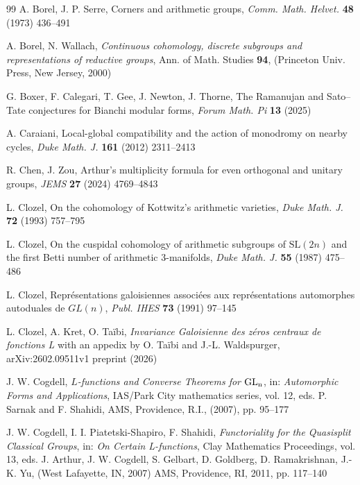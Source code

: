 \begin{thebibliography}{99}
 A. Borel, J. P. Serre, Corners and arithmetic groups, {\it Comm. Math. Helvet.} \textbf{48} (1973) 436--491

 A. Borel, N. Wallach, {\it Continuous cohomology, discrete subgroups and representations of reductive groups}, Ann. of Math. Studies {\bf 94}, (Princeton Univ. Press, New Jersey, 2000)

 G. Boxer, F. Calegari, T. Gee, J. Newton, J. Thorne, The Ramanujan and Sato--Tate conjectures for Bianchi modular forms, {\it Forum Math. Pi} \textbf{13} (2025)

 A. Caraiani, Local-global compatibility and the action of monodromy on nearby cycles, {\it Duke Math. J.} {\bf 161} (2012) 2311--2413

 R. Chen, J. Zou, Arthur's multiplicity formula for even orthogonal and unitary groups, {\it JEMS} {\bf 27} (2024) 4769--4843

 L. Clozel, On the cohomology of Kottwitz's arithmetic varieties, {\it Duke Math. J.} {\bf 72} (1993) 757--795

 L. Clozel, On the cuspidal cohomology of arithmetic subgroups of \(\text{SL}(2n)\) and the first Betti number of arithmetic $3$-manifolds, {\it Duke Math. J.} {\bf 55} (1987) 475--486 

 L. Clozel, Repr\'esentations galoisiennes associ\'ees aux repr\'esentations automorphes autoduales de $GL(n)$, {\it Publ. IHES} {\bf 73} (1991) 97--145

 L. Clozel, A. Kret, O. Ta\"ibi, {\it Invariance Galoisienne des z\'eros centraux de fonctions L} with an appedix by O. Ta\"ibi and J.-L. Waldspurger,  arXiv:2602.09511v1 preprint (2026)

 J. W. Cogdell, {\it $L$-functions and Converse Theorems for ${\rm GL_n}$}, in: {\it Automorphic Forms and Applications}, IAS/Park City mathematics series, vol. 12, eds. P. Sarnak and F. Shahidi, AMS, Providence, R.I., (2007), pp. 95--177

 J. W. Cogdell, I. I. Piatetski-Shapiro, F. Shahidi, {\it Functoriality for the Quasisplit Classical Groups}, in: {\it On Certain L-functions}, Clay Mathematics Proceedings, vol. 13, eds. J. Arthur, J. W. Cogdell, S. Gelbart, D. Goldberg, D. Ramakrishnan, J.-K. Yu, (West Lafayette, IN, 2007) AMS, Providence, RI, 2011, pp. 117--140



\end{thebibliography}
